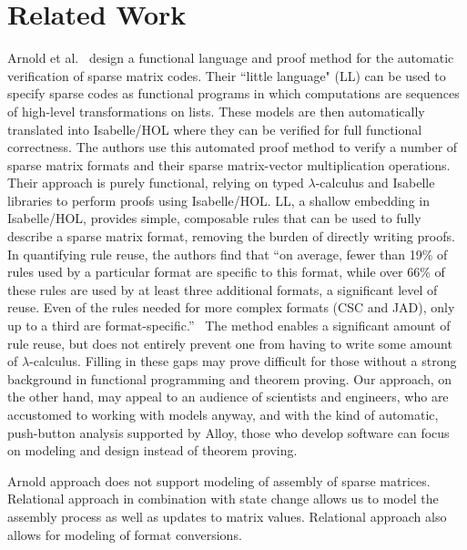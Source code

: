 \section{Related Work}
\label{sec:litrev}

Arnold et al.~\cite{arnold} design a functional language and proof method for the automatic verification of sparse matrix codes.  Their ``little language" (LL) can be used to specify sparse codes as functional programs in which computations are sequences of high-level transformations on lists.  These models are then automatically translated into Isabelle/HOL where they can be verified for full functional correctness.  The authors use this automated proof method to verify a number of sparse matrix formats and their sparse matrix-vector multiplication operations.  Their approach is purely functional, relying on typed $\lambda$-calculus and Isabelle libraries to perform proofs using Isabelle/HOL.  LL, a shallow embedding in Isabelle/HOL, provides simple, composable rules that can be used to fully describe a sparse matrix format, removing the burden of directly writing proofs.  In quantifying rule reuse, the authors find that ``on average, fewer than 19\% of rules used by a particular format are specific to this format, while over 66\% of these rules are used by at least three additional formats, a significant level of reuse.  Even of the rules needed for more complex formats (CSC and JAD), only up to a third are format-specific.''~\cite{arnold}  The method enables a significant amount of rule reuse, but does not entirely prevent one from having to write some amount of $\lambda$-calculus.  Filling in these gaps may prove difficult for those without a strong background in functional programming and theorem proving.  Our approach, on the other hand, may appeal to an audience of scientists and engineers, who are accustomed to working with models anyway, and with the kind of automatic, push-button analysis supported by Alloy, those who develop software can focus on modeling and design instead of theorem proving.

Arnold approach does not support modeling of assembly of sparse matrices.  Relational approach in combination with state change allows us to model the assembly process as well as updates to matrix values.  Relational approach also allows for modeling of format conversions.